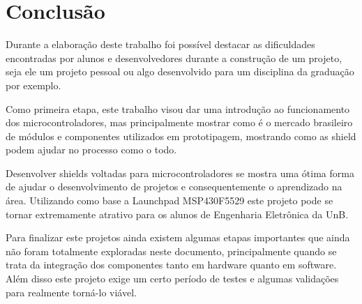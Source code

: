 \chapter[Conclusão]{Conclusão}

Durante a elaboração deste trabalho foi possível destacar as dificuldades encontradas por alunos e desenvolvedores durante a construção de um projeto, seja ele um projeto pessoal ou algo desenvolvido para um disciplina da graduação por exemplo.

Como primeira etapa, este trabalho visou dar uma introdução ao funcionamento dos microcontroladores, mas principalmente mostrar como é o mercado brasileiro de módulos e componentes utilizados em prototipagem, mostrando como as shield podem ajudar no processo como o todo.

Desenvolver shields voltadas para microcontroladores se mostra uma ótima forma de ajudar o desenvolvimento de projetos e consequentemente o aprendizado na área. Utilizando como base a Launchpad MSP430F5529 este projeto pode se tornar extremamente atrativo para os alunos de Engenharia Eletrônica da UnB.

Para finalizar este projetos ainda existem algumas etapas importantes que ainda não foram totalmente exploradas neste documento, principalmente quando se trata da integração dos componentes tanto em hardware quanto em software. Além disso este projeto exige um certo período de testes e algumas validações para realmente torná-lo viável.